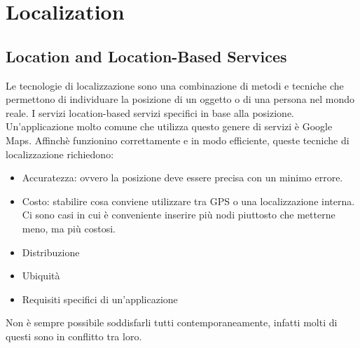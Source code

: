 
\newcommand{\tabitem}{~~\llap{\textbullet}~~}

% 
\chapter{Localization}\label{sec3}

\section{Location and Location-Based Services}\label{subsec3.1}
        Le tecnologie di localizzazione sono una combinazione di metodi e
tecniche che permettono di individuare la posizione di un oggetto o di una
persona nel mondo reale. I servizi location-based servizi specifici in base alla
posizione. Un'applicazione molto comune che utilizza questo genere di servizi è
Google Maps.
        Affinchè funzionino correttamente e in modo efficiente, queste tecniche
di localizzazione richiedono:
        \begin{itemize}
                \item Accuratezza: ovvero la posizione deve essere precisa con
un minimo errore.
                \item Costo: stabilire cosa conviene utilizzare tra GPS o una
localizzazione interna. Ci sono casi in cui è conveniente inserire più nodi
piuttosto che metterne meno, ma più costosi.
                \item Distribuzione
                \item Ubiquità
                \item Requisiti specifici di un'applicazione
        \end{itemize}
        Non è sempre possibile soddisfarli tutti contemporaneamente, infatti
molti di questi sono in conflitto tra loro.

